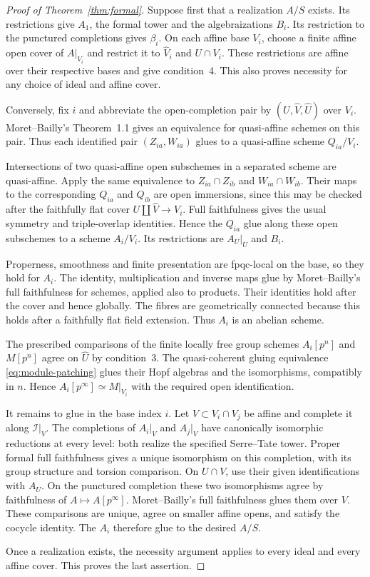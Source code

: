 \documentclass[11pt]{article}
\theoremstyle{definition}\newtheorem{definition}[theorem]{Definition}
\theoremstyle{remark}\newtheorem{remark}[theorem]{Remark}
\begin{document}
\begin{proof}[Proof of Theorem~\ref{thm:formal}]
Suppose first that a realization $A/S$ exists. Its restrictions give $A_1$, the formal tower and the algebraizations $B_i$. Its restriction to the punctured completions gives $\beta_i$. On each affine base $V_i$, choose a finite affine open cover of $A|_{V_i}$ and restrict it to $\widehat V_i$ and $U\cap V_i$. These restrictions are affine over their respective bases and give condition~4. This also proves necessity for any choice of ideal and affine cover.

Conversely, fix $i$ and abbreviate the open-completion pair by $(U,\widehat V,\widehat U)$ over $V_i$. Moret--Bailly's Theorem~1.1 \citep[p.~565]{MoretBailly} gives an equivalence for quasi-affine schemes on this pair. Thus each identified pair $(Z_{ia},W_{ia})$ glues to a quasi-affine scheme $Q_{ia}/V_i$.

Intersections of two quasi-affine open subschemes in a separated scheme are quasi-affine. Apply the same equivalence to $Z_{ia}\cap Z_{ib}$ and $W_{ia}\cap W_{ib}$. Their maps to the corresponding $Q_{ia}$ and $Q_{ib}$ are open immersions, since this may be checked after the faithfully flat cover $U\amalg\widehat V\to V_i$. Full faithfulness gives the usual symmetry and triple-overlap identities. Hence the $Q_{ia}$ glue along these open subschemes to a scheme $A_i/V_i$. Its restrictions are $A_U|_U$ and $B_i$.

Properness, smoothness and finite presentation are fpqc-local on the base, so they hold for $A_i$. The identity, multiplication and inverse maps glue by Moret--Bailly's full faithfulness for schemes, applied also to products. Their identities hold after the cover and hence globally. The fibres are geometrically connected because this holds after a faithfully flat field extension. Thus $A_i$ is an abelian scheme.

The prescribed comparisons of the finite locally free group schemes $A_i[p^n]$ and $M[p^n]$ agree on $\widehat U$ by condition~3. The quasi-coherent gluing equivalence \eqref{eq:module-patching} glues their Hopf algebras and the isomorphisms, compatibly in $n$. Hence $A_i[p^\infty]\simeq M|_{V_i}$ with the required open identification.

It remains to glue in the base index $i$. Let $V\subset V_i\cap V_j$ be affine and complete it along $\mathcal I|_V$. The completions of $A_i|_V$ and $A_j|_V$ have canonically isomorphic reductions at every level: both realize the specified Serre--Tate tower. Proper formal full faithfulness \citep[Theorem~5.4.1, pp.~156--157]{EGAIII} gives a unique isomorphism on this completion, with its group structure and torsion comparison. On $U\cap V$, use their given identifications with $A_U$. On the punctured completion these two isomorphisms agree by faithfulness of $A\mapsto A[p^\infty]$. Moret--Bailly's full faithfulness glues them over $V$. These comparisons are unique, agree on smaller affine opens, and satisfy the cocycle identity. The $A_i$ therefore glue to the desired $A/S$.

Once a realization exists, the necessity argument applies to every ideal and every affine cover. This proves the last assertion.
\end{proof}
\end{document}
